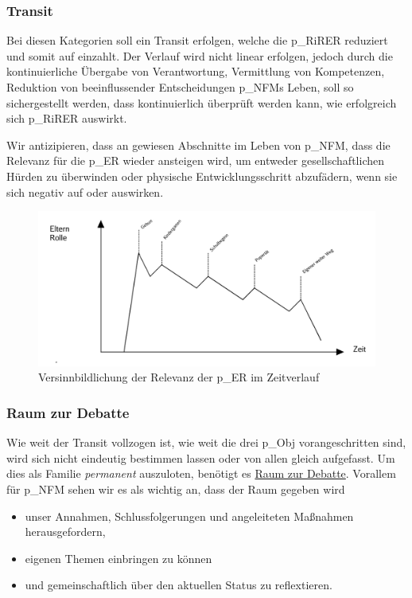 \subsubsection{Transit}
Bei diesen Kategorien soll ein Transit erfolgen, welche die \gls{p_RiRER} reduziert und somit auf  einzahlt. Der Verlauf wird nicht linear erfolgen, jedoch durch die kontinuierliche Übergabe von Verantwortung, Vermittlung von Kompetenzen, Reduktion von beeinflussender Entscheidungen \gls{p_NFM}s Leben, soll so sichergestellt werden, dass  kontinuierlich überprüft werden kann, wie erfolgreich sich \gls{p_RiRER} auswirkt. 

Wir antizipieren, dass an gewiesen Abschnitte im Leben von \gls{p_NFM}, dass die Relevanz für die \gls{p_ER} wieder ansteigen wird, um entweder gesellschaftlichen Hürden zu überwinden oder physische Entwicklungsschritt abzufädern, wenn sie sich negativ auf  oder  auswirken.

\begin{figure}[H]
	\centering
	\includegraphics[scale = 0.3]{attachment/chapter_OWN/Scc005.png}
	\caption{Versinnbildlichung der Relevanz der \gls{p_ER} im Zeitverlauf}
\end{figure} 

\subsubsection{Raum zur Debatte} Wie weit der Transit vollzogen ist, wie weit die drei \gls{p_Obj} vorangeschritten sind, wird sich nicht eindeutig bestimmen lassen oder von allen gleich aufgefasst. Um dies als Familie \textit{permanent} auszuloten, benötigt es \underline{Raum zur Debatte}. Vorallem für \gls{p_NFM} sehen wir es als wichtig an, dass der Raum gegeben wird
\begin{itemize}
	\item unser Annahmen, Schlussfolgerungen und angeleiteten Maßnahmen herausgefordern, 
	\item eigenen Themen einbringen zu können
	\item und gemeinschaftlich über den aktuellen Status zu reflextieren.
\end{itemize}



